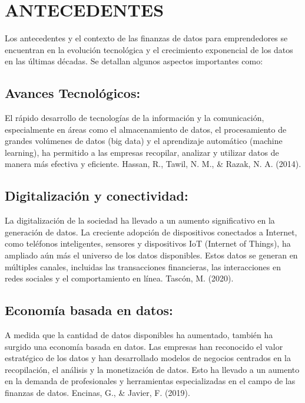 \documentclass[
  letterpaper,
  DIV=11,
  numbers=noendperiod]{scrreprt}
\begin{document}
\hypertarget{antecedentes}{%
\section{ANTECEDENTES}\label{antecedentes}}

Los antecedentes y el contexto de las finanzas de datos para
emprendedores se encuentran en la evolución tecnológica y el crecimiento
exponencial de los datos en las últimas décadas. Se detallan algunos
aspectos importantes como:

\hypertarget{avances-tecnoluxf3gicos}{%
\subsection{Avances Tecnológicos:}\label{avances-tecnoluxf3gicos}}

El rápido desarrollo de tecnologías de la información y la comunicación,
especialmente en áreas como el almacenamiento de datos, el procesamiento
de grandes volúmenes de datos (big data) y el aprendizaje automático
(machine learning), ha permitido a las empresas recopilar, analizar y
utilizar datos de manera más efectiva y eficiente. Hassan, R., Tawil, N.
M., \& Razak, N. A. (2014).

\hypertarget{digitalizaciuxf3n-y-conectividad}{%
\subsection{Digitalización y
conectividad:}\label{digitalizaciuxf3n-y-conectividad}}

La digitalización de la sociedad ha llevado a un aumento significativo
en la generación de datos. La creciente adopción de dispositivos
conectados a Internet, como teléfonos inteligentes, sensores y
dispositivos IoT (Internet of Things), ha ampliado aún más el universo
de los datos disponibles. Estos datos se generan en múltiples canales,
incluidas las transacciones financieras, las interacciones en redes
sociales y el comportamiento en línea. Tascón, M. (2020).

\hypertarget{economuxeda-basada-en-datos}{%
\subsection{Economía basada en
datos:}\label{economuxeda-basada-en-datos}}

A medida que la cantidad de datos disponibles ha aumentado, también ha
surgido una economía basada en datos. Las empresas han reconocido el
valor estratégico de los datos y han desarrollado modelos de negocios
centrados en la recopilación, el análisis y la monetización de datos.
Esto ha llevado a un aumento en la demanda de profesionales y
herramientas especializadas en el campo de las finanzas de datos.
Encinas, G., \& Javier, F. (2019).
\end{document}
